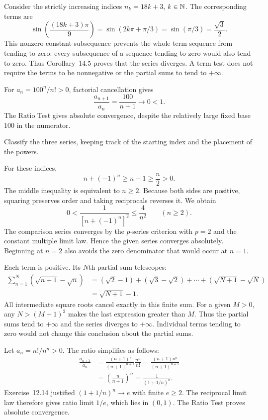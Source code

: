 Consider the strictly increasing indices $n_k=18k+3$,
$k\in\mathbb{N}$. The corresponding terms are
\[
 \sin\left(\frac{(18k+3)\pi}{9}\right)
 =\sin(2k\pi+\pi/3)=\sin(\pi/3)=\frac{\sqrt3}{2}.
\]
This nonzero constant subsequence prevents the whole term sequence
from tending to zero: every subsequence of a sequence tending to
zero would also tend to zero. Thus Corollary~14.5 proves that the
series diverges. A term test does not require the terms to be
nonnegative or the partial sums to tend to $+\infty$.

For $a_n=100^n/n!>0$, factorial cancellation gives
\[
 \frac{a_{n+1}}{a_n}=\frac{100}{n+1}\longrightarrow0<1.
\]
The Ratio Test gives absolute convergence, despite the relatively
large fixed base $100$ in the numerator.


\goal Classify the three series, keeping track of the starting
index and the placement of the powers.

For these indices,
\[
 n+(-1)^n\ge n-1\ge\frac n2>0.
\]
The middle inequality is equivalent to $n\ge2$. Because both
sides are positive, squaring preserves order and taking reciprocals
reverses it. We obtain
\[
 0<\frac1{[n+(-1)^n]^2}\le\frac4{n^2}\qquad(n\ge2).
\]
The comparison series converges by the $p$-series criterion with
$p=2$ and the constant multiple limit law. Hence the given series
converges absolutely. Beginning at $n=2$ also avoids the zero
denominator that would occur at $n=1$.

Each term is positive. Its $N$th partial sum telescopes:
\[
 \begin{aligned}
 \sum_{n=1}^{N}(\sqrt{n+1}-\sqrt n)
 &=(\sqrt2-1)+(\sqrt3-\sqrt2)+\cdots
     +(\sqrt{N+1}-\sqrt N)\\
 &=\sqrt{N+1}-1.
 \end{aligned}
\]
All intermediate square roots cancel exactly in this finite sum.
For a given $M>0$, any $N>(M+1)^2$ makes the last expression
greater than $M$. Thus the partial sums tend to $+\infty$ and
the series diverges to $+\infty$. Individual terms tending to
zero would not change this conclusion about the partial sums.

Let $a_n=n!/n^n>0$. The ratio simplifies as follows:
\[
 \begin{aligned}
 \frac{a_{n+1}}{a_n}
 &=\frac{(n+1)!}{(n+1)^{n+1}}\frac{n^n}{n!}
 =\frac{(n+1)n^n}{(n+1)^{n+1}}\\
 &=\left(\frac{n}{n+1}\right)^n
 =\frac1{(1+1/n)^n}.
 \end{aligned}
\]
Exercise~12.14 justified $(1+1/n)^n\to e$ with finite $e\ge2$.
The reciprocal limit law therefore gives ratio limit $1/e$,
which lies in $(0,1)$. The Ratio Test proves absolute convergence.
